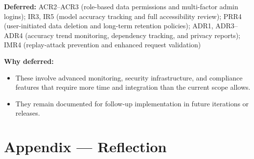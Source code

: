 \documentclass{article}
\begin{document}
\noindent \textbf{Deferred:} ACR2--ACR3 (role-based data permissions and multi-factor admin logins); IR3, IR5 (model accuracy tracking and full accessibility review); PRR4 (user-initiated data deletion and long-term retention policies); ADR1, ADR3--ADR4 (accuracy trend monitoring, dependency tracking, and privacy reports); IMR4 (replay-attack prevention and enhanced request validation)

\vspace{2mm}
\noindent \textbf{Why deferred:}
\begin{itemize}
  \item These involve advanced monitoring, security infrastructure, and compliance features that require more time and integration than the current scope allows.
  \item They remain documented for follow-up implementation in future iterations or releases.
\end{itemize}

\newpage{}

\section*{Appendix --- Reflection}

% 
\end{document}
